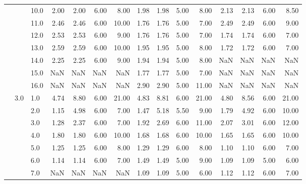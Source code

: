 \begin{tabular}{lllrrrrrrrrrrrr}
        &     & 10.0 &       2.00 &      2.00 & 6.00 &   8.00 &       1.98 &      1.98 & 5.00 &   8.00 &       2.13 &      2.13 & 6.00 &   8.50 \\
        &     & 11.0 &       2.46 &      2.46 & 6.00 &  10.00 &       1.76 &      1.76 & 5.00 &   7.00 &       2.49 &      2.49 & 6.00 &   9.00 \\
        &     & 12.0 &       2.53 &      2.53 & 6.00 &   9.00 &       1.76 &      1.76 & 5.00 &   7.00 &       1.74 &      1.74 & 6.00 &   7.00 \\
        &     & 13.0 &       2.59 &      2.59 & 6.00 &  10.00 &       1.95 &      1.95 & 5.00 &   8.00 &       1.72 &      1.72 & 6.00 &   7.00 \\
        &     & 14.0 &       2.25 &      2.25 & 6.00 &   9.00 &       1.94 &      1.94 & 5.00 &   8.00 &        NaN &       NaN &  NaN &    NaN \\
        &     & 15.0 &        NaN &       NaN &  NaN &    NaN &       1.77 &      1.77 & 5.00 &   7.00 &        NaN &       NaN &  NaN &    NaN \\
        &     & 16.0 &        NaN &       NaN &  NaN &    NaN &       2.90 &      2.90 & 5.00 &  11.00 &        NaN &       NaN &  NaN &    NaN \\
        & 3.0 & 1.0  &       4.74 &      8.80 & 6.00 &  21.00 &       4.83 &      8.81 & 6.00 &  21.00 &       4.80 &      8.56 & 6.00 &  21.00 \\
        &     & 2.0  &       1.15 &      4.98 & 6.00 &   7.00 &       1.47 &      5.18 & 5.50 &   9.00 &       1.79 &      4.92 & 6.00 &  10.00 \\
        &     & 3.0  &       1.28 &      2.37 & 6.00 &   7.00 &       1.92 &      2.69 & 6.00 &  11.00 &       2.07 &      3.01 & 6.00 &  12.00 \\
        &     & 4.0  &       1.80 &      1.80 & 6.00 &  10.00 &       1.68 &      1.68 & 6.00 &  10.00 &       1.65 &      1.65 & 6.00 &  10.00 \\
        &     & 5.0  &       1.25 &      1.25 & 6.00 &   8.00 &       1.29 &      1.29 & 6.00 &   8.00 &       1.10 &      1.10 & 6.00 &   7.00 \\
        &     & 6.0  &       1.14 &      1.14 & 6.00 &   7.00 &       1.49 &      1.49 & 5.00 &   9.00 &       1.09 &      1.09 & 5.00 &   6.00 \\
        &     & 7.0  &        NaN &       NaN &  NaN &    NaN &       1.09 &      1.09 & 5.00 &   6.00 &       1.12 &      1.12 & 6.00 &   7.00 \\

\end{tabular}
